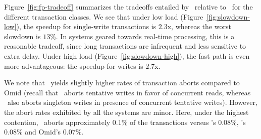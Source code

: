 Figure~\ref{fig:fp-tradeoff} summarizes the tradeoffs entailed by \sys\ relative to \sysll\ for the different transaction classes. 
We see that under low load (Figure~\ref{fig:slowdown-low}),
the speedup for single-write transactions is $2.3$x, whereas the worst slowdown is $13\%$. 
In systems geared towards real-time processing, this is a reasonable tradeoff, since long transactions 
are infrequent and less sensitive to extra delay.
Under high load (Figure~\ref{fig:slowdown-high}), the fast path is even more advantageous: the speedup for writes is $2.7$x.



We note that \sys\ yields slightly higher rates of transaction aborts compared to Omid 
(recall that \sysll\ aborts tentative writes in favor of concurrent reads, whereas  \sys\ also aborts
singleton writes in presence of concurrent tentative writes). However, the abort rates exhibited by all  
the systems are minor. 
Here, under the highest contention,  \sys\ aborts approximately $0.1\%$ 
of the transactions versus  \sysll's $0.08\%$,   
 \syspc's $0.08\%$ 
and Omid's $0.07\%$. 


